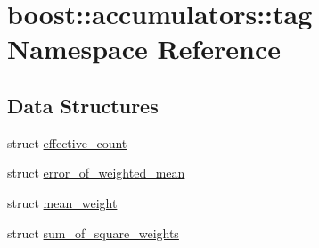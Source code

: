 \hypertarget{namespaceboost_1_1accumulators_1_1tag}{\section{boost\-:\-:accumulators\-:\-:tag Namespace Reference}
\label{namespaceboost_1_1accumulators_1_1tag}
}
\subsection*{Data Structures}
\begin{DoxyCompactItemize}
\item 
struct \hyperlink{structboost_1_1accumulators_1_1tag_1_1effective__count}{effective\-\_\-count}
\item 
struct \hyperlink{structboost_1_1accumulators_1_1tag_1_1error__of__weighted__mean}{error\-\_\-of\-\_\-weighted\-\_\-mean}
\item 
struct \hyperlink{structboost_1_1accumulators_1_1tag_1_1mean__weight}{mean\-\_\-weight}
\item 
struct \hyperlink{structboost_1_1accumulators_1_1tag_1_1sum__of__square__weights}{sum\-\_\-of\-\_\-square\-\_\-weights}
\end{DoxyCompactItemize}
